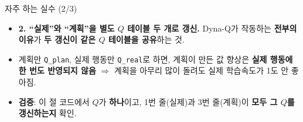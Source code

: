 \begin{frame}{자주 하는 실수 (2/3)}
  \begin{itemize}
    \item \textbf{2. ``실제''와 ``계획''을 \textbf{별도 $Q$ 테이블 두
      개}로 갱신.}
      Dyna-Q가 작동하는 \textbf{전부의 이유}가 \textbf{두 갱신이
      같은 $Q$ 테이블을 공유}하는 것.
    \item 계획만 \texttt{Q\_plan}, 실제 행동만 \texttt{Q\_real}로
      하면, 계획이 만든 값 향상은 \textbf{실제 행동에 한 번도
      반영되지 않음} $\Rightarrow$ 계획을 아무리 많이 돌려도
      실제 학습속도가 1도 안 좋아짐.
    \item \textbf{검증}: 이 절 코드에서 $Q$가 \textbf{하나}이고,
      1번 줄(실제)과 3번 줄(계획)이 \textbf{모두 그 $Q$를
      갱신하는지} 확인.
  \end{itemize}
\end{frame}
